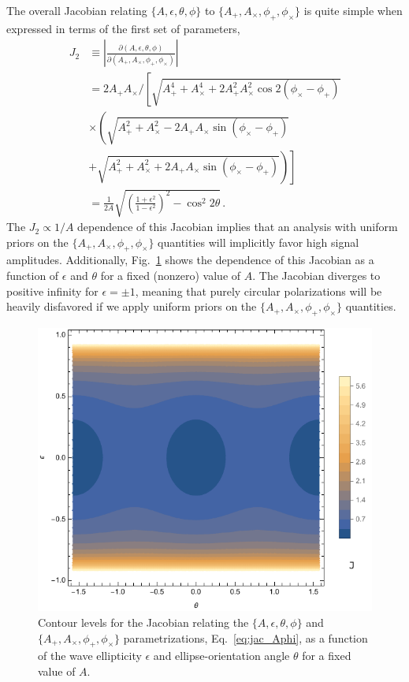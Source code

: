 \documentclass[aps,prd,twocolumn,superscriptaddress,preprintnumbers,floatfix,nofootinbib]{revtex4-2}
\begin{document}
The overall Jacobian relating $\{A, \epsilon, \theta, \phi\}$ to $\{A_+, A_\times, \phi_+, \phi_\times\}$ is quite simple when expressed in terms of the first set of parameters,
\begin{subequations} \label{eq:jac_Aphi}
\begin{align}
J_2 &\equiv \left| \frac{\partial(A, \epsilon, \theta, \phi)}{\partial(A_+, A_\times, \phi_+, \phi_\times)}\right| \nonumber \\
&= 2 A_+ A_\times/ \left[ \sqrt{A_+^4 + A_\times^4 + 2 A_+^2 A_\times^2 \cos 2(\phi_\times - \phi_+)} \right. \nonumber \\
& \times \left( \sqrt{A_+^2 + A_\times^2 -2 A_+ A_\times \sin(\phi_\times-\phi_+)} \right. \nonumber \\
&\left.\left. +  \sqrt{A_+^2 + A_\times^2 +2 A_+ A_\times \sin(\phi_\times-\phi_+)}\right)\right]\\
&= \frac{1}{2 A} \sqrt{\left(\frac{1 + \epsilon^2}{1 - \epsilon^2}\right)^2 - \cos^2 2\theta} \, .
\end{align}
\end{subequations}
The $J_2 \propto 1/A$ dependence of this Jacobian implies that an analysis with uniform priors on the $\{A_+, A_\times, \phi_+, \phi_\times\}$ quantities will implicitly favor high signal amplitudes.
Additionally, Fig.~\ref{fig:jac_Aphi} shows the dependence of this Jacobian as a function of $\epsilon$ and $\theta$ for a fixed (nonzero) value of $A$.
The Jacobian diverges to positive infinity for $\epsilon = \pm 1$, meaning that purely circular polarizations will be heavily disfavored if we apply uniform priors on the $\{A_+, A_\times, \phi_+, \phi_\times\}$ quantities.

\begin{figure}
\includegraphics[width=\columnwidth]{jac_Aellip_Aphi}
\caption{Contour levels for the Jacobian relating the $\{A, \epsilon, \theta, \phi\}$ and $\{A_+, A_\times, \phi_+, \phi_\times\}$ parametrizations, Eq.~\eqref{eq:jac_Aphi}, as a function of the wave ellipticity $\epsilon$ and ellipse-orientation angle $\theta$ for a fixed value of $A$.}
\label{fig:jac_Aphi}
\end{figure}
\end{document}
